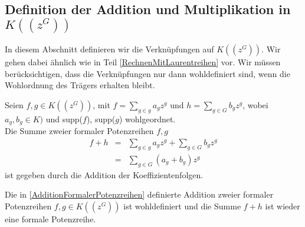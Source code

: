 \subsection{Definition der Addition und Multiplikation in $K((z^{G}))$}
%
%
%
%
%
%
In diesem Abschnitt definieren wir die Verknüpfungen auf $K((z^{G}))$. Wir gehen dabei ähnlich wie in Teil \ref{RechnenMitLaurentreihen} vor. Wir müssen berücksichtigen, dass die Verknüpfungen nur dann wohldefiniert sind, wenn die Wohlordnung des Trägers erhalten bleibt.
%
%
%
%
%
%
%
%
%
\begin{defn}\label{AdditionFormalerPotenzreihen}
Seien $f, g \in K\left(\left(z^G\right)\right)$, mit $f = \sum_{g \in g}^{} a_g z^g \text{ und } h = \sum_{g \in G}^{} b_g z^g$, wobei $a_g, b_g \in K)$ und supp($f$), supp($g$) wohlgeordnet. \\
Die Summe zweier formaler Potenzreihen $f, g$
%
\begin{eqnarray*}
f + h &=& \sum_{g \in g}^{} a_g z^g + \sum_{g \in G}^{} b_g z^g \\
&=& \sum_{g \in G}^{}\left(a_g + b_g\right)z^g 
\end{eqnarray*}
%
ist gegeben durch die Addition der Koeffizientenfolgen. 
\end{defn}
%
%
%
%
%
\begin{satz}\label{wohldefiniertheitAddition}
Die in \ref{AdditionFormalerPotenzreihen} definierte Addition zweier formaler Potenzreihen $f, g \in K\left(\left(z^{G}\right)\right)$ ist wohldefiniert und die Summe $f +h$ ist wieder eine formale Potenzreihe.
\end{satz}
